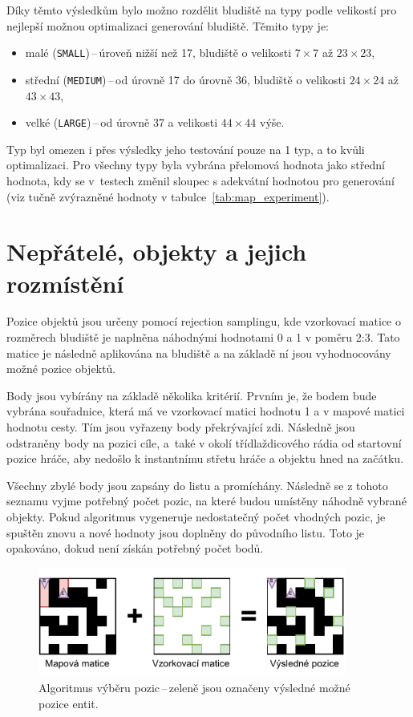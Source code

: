 Díky těmto výsledkům bylo možno rozdělit bludiště na typy podle velikostí pro nejlepší možnou optimalizaci generování bludiště. Těmito typy je:
\begin{itemize}
    \item  malé (\verb|SMALL|)\,--\,úroveň nižší než 17, bludiště o velikosti $7 \times 7$ až $23 \times 23$,
    \item střední (\verb|MEDIUM|)\,--\,od úrovně 17 do úrovně 36, bludiště o velikosti $24 \times 24$ až $43 \times 43$,
    \item velké (\verb|LARGE|)\,--\,od úrovně 37 a velikosti $44 \times 44 $ výše.
\end{itemize}

Typ  byl omezen i přes výsledky jeho testování pouze na 1 typ, a to kvůli optimalizaci. Pro všechny typy byla vybrána přelomová hodnota jako střední hodnota, kdy se v~testech změnil sloupec s adekvátní hodnotou pro generování (viz tučně zvýrazněné hodnoty v tabulce~\ref{tab:map_experiment}).

\section{Nepřátelé, objekty a jejich rozmístění}
Pozice objektů jsou určeny pomocí rejection samplingu, kde vzorkovací matice o rozměrech bludiště je naplněna náhodnými hodnotami 0 a 1 v poměru 2:3. Tato matice je následně aplikována na bludiště a na základě ní jsou vyhodnocovány možné pozice objektů.

Body jsou vybírány na základě několika kritérií. Prvním je, že bodem bude vybrána souřadnice, která má ve vzorkovací matici hodnotu 1 a v mapové matici hodnotu cesty. Tím jsou vyřazeny body překrývající zdi. Následně jsou odstraněny body na pozici cíle, a~také v okolí třídlaždicového rádia od startovní pozice hráče, aby nedošlo k instantnímu střetu hráče a objektu hned na začátku.

Všechny zbylé body jsou zapsány do listu a promíchány. Následně se z tohoto seznamu vyjme potřebný počet pozic, na které budou umístěny náhodně vybrané objekty. Pokud algoritmus vygeneruje nedostatečný počet vhodných pozic, je spuštěn znovu a nové hodnoty jsou doplněny do původního listu. Toto je opakováno, dokud není získán potřebný počet bodů.

\begin{figure}[H]
    \centering
    \includegraphics[width=0.9\textwidth]{obrazky-figures/ch4/vyber_pozic.pdf}
    \caption{Algoritmus výběru pozic\,--\,zeleně jsou označeny výsledné možné pozice entit.}
    \label{fig:vyber_pozic}
\end{figure}

